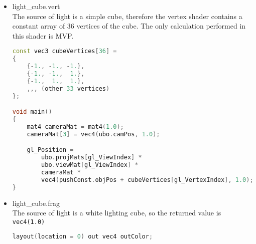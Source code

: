 \begin{itemize}
\begin{lstlisting}[language=c++, caption=Grid fragment shader(./assets/shaders/grid.frag)]
    float lod0 = gridCellSize * pow(10.0, floor(lodLevel));
    float lod1 = lod0 * 10.0;
    float lod2 = lod1 * 10.0;

    dudv *= 4.0;

    float lod0a = max2(vec2(1.0) - abs(satv(mod(uv, lod0) / dudv) * 2.0 - vec2(1.0)));
    float lod1a = max2(vec2(1.0) - abs(satv(mod(uv, lod1) / dudv) * 2.0 - vec2(1.0)));
    float lod2a = max2(vec2(1.0) - abs(satv(mod(uv, lod2) / dudv) * 2.0 - vec2(1.0)));

    uv -= camPos;

    vec4 c = lod2a > 0.0 ? gridColorThick : lod1a > 0.0 ? mix(gridColorThick, gridColorThin, lodFade) : gridColorThin;

    float opacityFalloff = (1.0 - satf(length(uv) / gridSize));

    c.a *= (lod2a > 0.0 ? lod2a : lod1a > 0.0 ? lod1a : (lod0a * (1.0-lodFade))) * opacityFalloff;

    return c;
}

void main()
{
    outColor = gridColor(uv, camPos);
}
\end{lstlisting}
    \item light\_cube.vert\\
    The source of light is a simple cube, therefore the vertex shader contains a constant array of 36 vertices of the cube. The only calculation performed in this shader is MVP.
\begin{lstlisting}[language=c++, caption=Light cube vertex shader(./assets/shaders/light\_cube.vert)]
const vec3 cubeVertices[36] =
{
    {-1., -1., -1.},
    {-1., -1.,  1.},
    {-1.,  1.,  1.},
    ,,, (other 33 vertices)
};

void main()
{
    mat4 cameraMat = mat4(1.0);
    cameraMat[3] = vec4(ubo.camPos, 1.0);

    gl_Position =
        ubo.projMats[gl_ViewIndex] *
        ubo.viewMat[gl_ViewIndex] *
        cameraMat *
        vec4(pushConst.objPos + cubeVertices[gl_VertexIndex], 1.0);
}
\end{lstlisting}
    \item light\_cube.frag\\
    The source of light is a white lighting cube, so the returned value is \texttt{vec4(1.0)}
\begin{lstlisting}[language=c++, caption=Light cube fragment shader(./assets/shaders/light\_cube.frag)]
layout(location = 0) out vec4 outColor;


\end{lstlisting}
\end{itemize}
